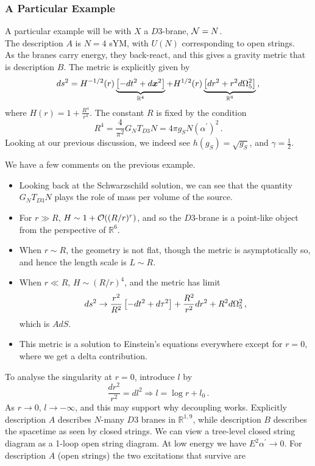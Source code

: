 \documentclass{article}
\begin{document}
\subsubsection{A Particular Example} 
A particular example will be with $X$ a $D3$-brane, $\mathcal{N}=N$. \\
	The description $A$ is $N=4$ sYM, with $U(N)$ corresponding to open strings. \\
	As the branes carry energy, they back-react, and this gives a gravity metric that is description $B$. The metric is explicitly given by 
	\[
	ds^2 = H^{-1/2}(r) \underbrace{\left[ -dt^2 + d\bm{x}^2 \right]}_{\mathbb{R}^4} + H^{1/2}(r) \underbrace{\left[ dr^2 + r^2 d\Omega_5^2 \right]}_{\mathbb{R}^6} \, , 
	\]
	where $H(r) = 1+ \frac{R^4}{r^4}$. The constant $R$ is fixed by the condition 
	\[
	R^4 = \frac{4}{\pi^2} G_N T_{D3} N = 4 \pi g_S N (\alpha^\prime)^2 \, .
	\] 
	Looking at our previous discussion, we indeed see $h(g_S) = \sqrt{g_S}$, and $\gamma = \frac{1}{2}$. 
\begin{remark}
	We have a few comments on the previous example. 
\begin{itemize}
	\item Looking back at the Schwarzschild solution, we can see that the quantity $G_N T_{D3} N$ plays the role of mass per volume of the source.
	\item For $r \gg R$, $H \sim 1 + \mathcal{O}((R/r)^r)$, and so the $D3$-brane is a point-like object from the perspective of $\mathbb{R}^6$. 
	\item When $r \sim R$, the geometry is not flat, though the metric is asymptotically so, and hence the length scale is $L \sim R$. 
	\item When $r \ll R$, $H \sim (R/r)^4$, and the metric has limit 
	\[
	ds^2 \to \frac{r^2}{R^2} \left[ -dt^2 + d\tau^2 \right] + \frac{R^2}{r^2} dr^2 + R^2 d \Omega_5^2 \, ,
	\]
	which is $AdS$. 
	\item This metric is a solution to Einstein's equations everywhere except for $r=0$, where we get a delta contribution. 
\end{itemize} 
\end{remark}
To analyse the singularity at $r=0$, introduce $l$ by 
\[
\frac{dr^2}{r^2} = dl^2 \Rightarrow l = \log r + l_0 \, .
\]
As $r \to 0, \, l \to -\infty$, and this may support why decoupling works. Explicitly description $A$ describes $N$-many $D3$ branes in $\mathbb{R}^{1,9}$, while description $B$ describes the spacetime as seen by closed strings. We can view a tree-level closed string diagram as a 1-loop open string diagram. At low energy we have $E^2 \alpha^\prime \to 0$. For description $A$ (open strings) the two excitations that survive are
\end{document}
